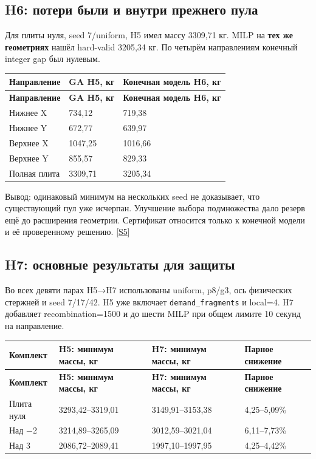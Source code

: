\documentclass[11pt,a4paper]{article}
\begin{document}
\subsection{H6: потери были и внутри прежнего пула}

Для плиты нуля, seed 7/uniform, H5 имел массу 3309,71 кг. MILP на \textbf{тех же геометриях} нашёл hard-valid 3205,34 кг. По четырём направлениям конечный integer gap был нулевым.


{\small\setlength{\tabcolsep}{4pt}
\begin{longtable}{@{}L{41.178mm}L{63.351mm}L{53.848mm}@{}}
\toprule
\textbf{Направление} & \textbf{GA H5, кг} & \textbf{Конечная модель H6, кг} \\
\midrule\endfirsthead
\toprule
\textbf{Направление} & \textbf{GA H5, кг} & \textbf{Конечная модель H6, кг} \\
\midrule\endhead
\bottomrule\endfoot
Нижнее X & 734,12 & 719,38 \\
Нижнее Y & 672,77 & 639,97 \\
Верхнее X & 1047,25 & 1016,66 \\
Верхнее Y & 855,57 & 829,33 \\
Полная плита & 3309,71 & 3205,34 \\
\end{longtable}}

Вывод: одинаковый минимум на нескольких seed не доказывает, что существующий пул уже исчерпан. Улучшение выбора подмножества дало резерв ещё до расширения геометрии. Сертификат относится только к конечной модели и её проверенному решению. {\color{Teal}\small[\hyperlink{S5}{S5}]}


\subsection{H7: основные результаты для защиты}

Во всех девяти парах H5→H7 использованы uniform, p8/g3, ось физических стержней и seed 7/17/42. H5 уже включает {\small\nolinkurl{demand_fragments}} и local=4. H7 добавляет recombination=1500 и до шести MILP при общем лимите 10 секунд на направление.


{\small\setlength{\tabcolsep}{4pt}
\begin{longtable}{@{}L{52.892mm}L{35.780mm}L{35.780mm}L{31.113mm}@{}}
\toprule
\textbf{Комплект} & \textbf{H5: минимум массы, кг} & \textbf{H7: минимум массы, кг} & \textbf{Парное снижение} \\
\midrule\endfirsthead
\toprule
\textbf{Комплект} & \textbf{H5: минимум массы, кг} & \textbf{H7: минимум массы, кг} & \textbf{Парное снижение} \\
\midrule\endhead
\bottomrule\endfoot
Плита нуля & 3293,42–3319,01 & 3149,91–3153,38 & 4,25–5,09\% \\
Над −2 & 3214,89–3265,09 & 3012,59–3021,04 & 6,11–7,73\% \\
Над 3 & 2086,72–2089,41 & 1997,10–1997,95 & 4,25–4,42\% \\
\end{longtable}}
\end{document}
